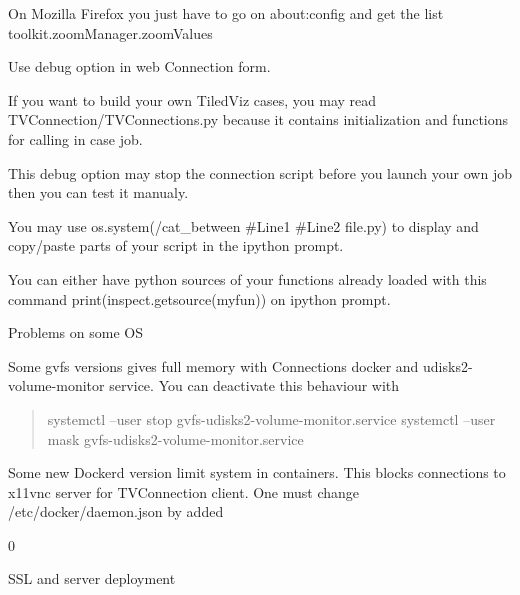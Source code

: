 On Mozilla Firefox you just have to go on about:\+config and get the list toolkit.\+zoom\+Manager.\+zoom\+Values


\begin{DoxyEnumerate}
\item Use debug option in web Connection form.
\end{DoxyEnumerate}

If you want to build your own Tiled\+Viz cases, you may read TVConnection/\+\+TVConnections.\+py because it contains initialization and functions for calling in case job.

This debug option may stop the connection script before you launch your own job then you can test it manualy.

You may use os.\+system(\textquotesingle{}/\+cat\+\_\+between \+\#\+Line1 \+\#\+Line2 file.\+py\textquotesingle{}) to display and copy/\+paste parts of your script in the ipython prompt.

You can either have python sources of your functions already loaded with this command print(inspect.\+getsource(myfun)) on ipython prompt.


\begin{DoxyEnumerate}
\item Problems on some OS
\end{DoxyEnumerate}

Some gvfs versions gives full memory with Connections docker and udisks2-\/volume-\/monitor service. You can deactivate this behaviour with \begin{quote}
systemctl --user stop gvfs-\/udisks2-\/volume-\/monitor.\+service systemctl --user mask gvfs-\/udisks2-\/volume-\/monitor.\+service \end{quote}


Some new Dockerd version limit system in containers. This blocks connections to x11vnc server for TVConnection client. One must change /\+etc/\+docker/\+daemon.json by added 
\begin{DoxyCode}{0}
\DoxyCodeLine{\ \ \ \ \}}
\DoxyCodeLine{\}}

\end{DoxyCode}



\begin{DoxyEnumerate}
\item SSL and server deployment
\end{DoxyEnumerate}

